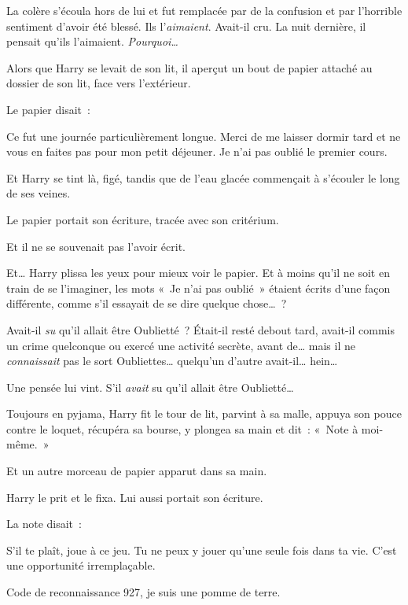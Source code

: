 La colère s'écoula hors de lui et fut remplacée par de la confusion et par l'horrible sentiment d'avoir été blessé. Ils l'\emph{aimaient}. Avait-il cru. La nuit dernière, il pensait qu'ils l'aimaient. \emph{Pourquoi…}

Alors que Harry se levait de son lit, il aperçut un bout de papier attaché au dossier de son lit, face vers l'extérieur.

Le papier disait~:

\begin{writtenNote}

Ce fut une journée particulièrement longue. Merci de me laisser dormir tard et ne vous en faites pas pour mon petit déjeuner. Je n'ai pas oublié le premier cours.

\end{writtenNote}

Et Harry se tint là, figé, tandis que de l'eau glacée commençait à s'écouler le long de ses veines.

Le papier portait son écriture, tracée avec son critérium.

Et il ne se souvenait pas l'avoir écrit.

Et… Harry plissa les yeux pour mieux voir le papier. Et à moins qu'il ne soit en train de se l'imaginer, les mots «~Je n'ai pas oublié~» étaient écrits d'une façon différente, comme s'il essayait de se dire quelque chose…~?

Avait-il \emph{su} qu'il allait être Oublietté~? Était-il resté debout tard, avait-il commis un crime quelconque ou exercé une activité secrète, avant de… mais il ne \emph{connaissait} pas le sort Oubliettes… quelqu'un d'autre avait-il… hein…

Une pensée lui vint. S'il \emph{avait} su qu'il allait être Oublietté…

Toujours en pyjama, Harry fit le tour de lit, parvint à sa malle, appuya son pouce contre le loquet, récupéra sa bourse, y plongea sa main et dit~: «~Note à moi-même.~»

Et un autre morceau de papier apparut dans sa main.

Harry le prit et le fixa. Lui aussi portait son écriture.

La note disait~:

\begin{writtenNote}

S'il te plaît, joue à ce jeu. Tu ne peux y jouer qu'une seule fois dans ta vie. C'est une opportunité irremplaçable.

Code de reconnaissance 927, je suis une pomme de terre.

\end{writtenNote}

